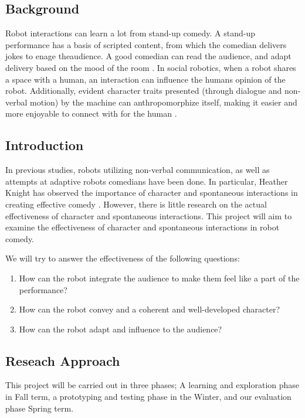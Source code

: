 \documentclass[onecolumn, draftclsnofoot,10pt, compsoc]{IEEEtran}
\begin{document}
\subsection{Background}
Robot interactions can learn a lot from stand-up comedy. A stand-up performance has a basis of scripted content, from which the comedian delivers jokes to enage theaudience. A good comedian can read the audience, and adapt delivery based on the mood of the room \cite{talkingFunny}. In social robotics, when a robot shares a space with a human, an interaction can influence the humans opinion of the robot. Additionally, evident character traits presented (through dialogue and non-verbal motion) by the machine can anthropomorphize itself, making it easier and more enjoyable to connect with for the human \cite{KnightEightLessons:2011}.



\subsection{Introduction}
In previous studies, robots utilizing non-verbal communication, as well as attempts at adaptive robots comedians have been done. In particular, Heather Knight has observed the importance of character and spontaneous interactions in creating effective comedy \cite{KnightEightLessons:2011}. However, there is little research on the actual effectiveness of character and spontaneous interactions. This project will aim to examine the effectiveness of character and spontaneous interactions in robot comedy.

We will try to answer the effectiveness of the following questions:
\begin{enumerate}[\IEEEsetlabelwidth{6)}]
\item How can the robot integrate the audience to make them feel like a part of the performance?
\item How can the robot convey and a coherent and well-developed character?
\item How can the robot adapt and influence to the audience?
\end{enumerate}


\subsection{Reseach Approach}
This project will be carried out in three phases; A learning and exploration phase in Fall term, a prototyping and testing phase in the Winter, and our evaluation phase Spring term.
\end{document}
